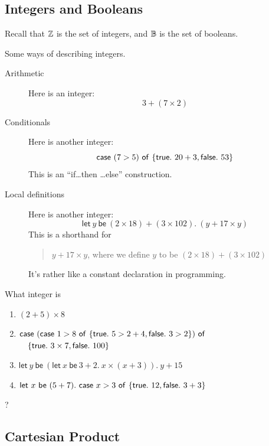 \documentclass[runningheads,12pt]{llncs}
\newcommand{\itletmac}[2]{\mathsf{let}\ {#2}\ \mathsf{be}\ {#1}.\ }
\begin{document}
\subsection{Integers and Booleans}

Recall that $\mathbb{Z}$ is the set of integers, and $\mathbb{B}$ is the set of booleans.

Some ways of describing integers.
\begin{description}
\item[Arithmetic] Here is an integer:
\begin{displaymath}
  3+(7 \times 2)
\end{displaymath}
\item[Conditionals] Here is another integer:
  \begin{displaymath}
    \mathsf{case} \  (7>5) \ \mathsf{of} \  \{\mathsf{true}.\ 20+3, \mathsf{false}.\ 53 \}
  \end{displaymath}
This is an ``if\ldots then \ldots else'' construction.  %
\item[Local definitions] Here is another integer:
\begin{displaymath}
  \itletmac{(2\times 18)+(3 \times 102)}{y} (y+17\times y)
\end{displaymath}
This is a shorthand for 
\begin{quotation}
  $y+17 \times y$, where we define $y$ to be $(2\times 18)+(3 \times 102)$
\end{quotation}
It's rather like a constant declaration in programming.
\end{description}

\begin{exercise}
What integer is 
\begin{enumerate}
\item $(2+5) \times 8$
\item $\mathsf{case} \  (\mathsf{case} \  1>8 \ \mathsf{of} \  \{\mathsf{true} .\  5>2+4, \mathsf{false}.\  3>2\}) \ \mathsf{of} \ $  $\quad \{\mathsf{true}.\  3 \times 7, \mathsf{false}.\  100 \}$
\item $\itletmac{ (\itletmac{ 3+2 }{ x } x \times (x+3)) }{ y } y+15$
\item $\itletmac{ (5+7) }{ x } \itcase x>3 \itof \{ \ittrue\itin 12, \itfalse\itin 3+3 \}$ 
\end{enumerate}
?
\end{exercise}

\subsection{Cartesian Product}
\end{document}
